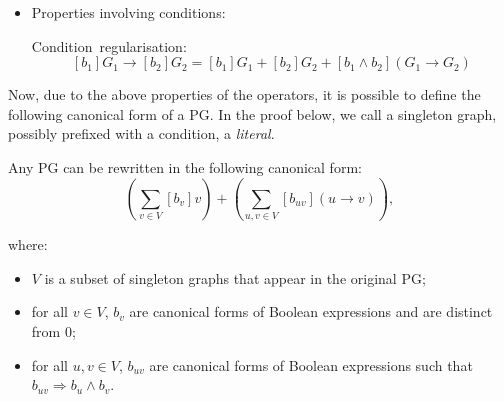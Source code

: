 \begin{itemize}
\item \hspace{-1mm}Properties involving conditions:


\hspace{2mm}Condition~regularisation: \vspace{-0.3em}
\[
[b_{1}]G_{1}\!\rightarrow\![b_{2}]G_{2}\!=\![b_{1}]G_{1}+[b_{2}]G_{2}+[b_{1}\wedge b_{2}](G_{1}\!\rightarrow\! G_{2})
\]


\end{itemize}
Now, due to the above properties of the operators, it is possible
to define the following canonical form of a PG. In the proof below,
we call a singleton graph, possibly prefixed with a condition, a \emph{literal}.
\begin{prop}
\label{prop:Canonical-form} Any PG can be
rewritten in the following canonical form:
\begin{equation}
\left(\sum_{v\in V}[b_{v}]v\right)+\left(\sum_{u,v\in V}[b_{uv}](u\rightarrow v)\right),\label{eq:canonical-form}
\end{equation}


where:
\begin{itemize}
\item $V$ is a subset of singleton graphs that appear in the original PG;
\item for all $v\in V$, $b_{v}$ are canonical forms of Boolean expressions
and are distinct from 0;
\item for all $u,v\in V$, $b_{uv}$ are canonical forms of Boolean expressions
such that $b_{uv}\Rightarrow b_{u}\wedge b_{v}$.
\end{itemize}
\end{prop}
